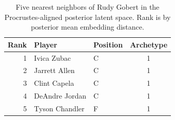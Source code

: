 \begin{table}[htbp]
  \centering\small
  \begin{tabular}{rllc}
    \toprule
    Rank & Player & Position & Archetype \\
    \midrule
    1 & Ivica Zubac & C & 1 \\
    2 & Jarrett Allen & C & 1 \\
    3 & Clint Capela & C & 1 \\
    4 & DeAndre Jordan & C & 1 \\
    5 & Tyson Chandler & F & 1 \\
    \bottomrule
  \end{tabular}
  \caption{Five nearest neighbors of Rudy Gobert in the Procrustes-aligned posterior latent space. Rank is by posterior mean embedding distance.}
  \label{tab:Rudy_Gobert_neighbors}
\end{table}

